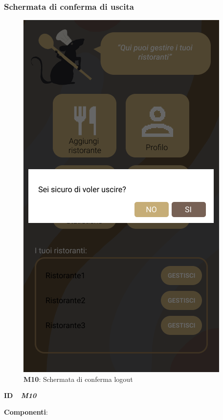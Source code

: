         \subsubsection{Schermata di conferma di uscita}
          \begin{figure}[H]
            \centering
            \includegraphics[scale=0.5]{assets/diagrammi/Mockup/Mockup_ExitDialog.png}
            \caption*{\textbf{M10}: Schermata di conferma logout}\label{fig:Mockup_ExitDialog}
          \end{figure}

          \begin{flushleft}
            \textbf{ID}   \ \Large{ \emph{\textbf{M10}}}
          \end{flushleft}

          \textbf{Componenti}:


